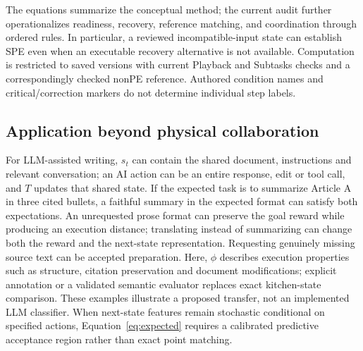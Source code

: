 \documentclass[11pt]{article}
\begin{document}
The equations summarize the conceptual method; the current audit further
operationalizes readiness, recovery, reference matching, and coordination
through ordered rules. In particular, a reviewed incompatible-input state
can establish SPE even when an executable recovery alternative is not
available. Computation is restricted to saved versions with current
Playback and Subtasks checks and a correspondingly checked nonPE
reference. Authored condition names and critical/correction markers do not
determine individual step labels.

\subsection{Application beyond physical collaboration}
For LLM-assisted writing, $s_t$ can contain the shared document,
instructions and relevant conversation; an AI action can be an entire
response, edit or tool call, and $T$ updates that shared state. If the
expected task is to summarize Article A in three cited bullets, a faithful
summary in the expected format can satisfy both expectations. An unrequested
prose format can preserve the goal reward while producing an execution
distance; translating instead of summarizing can change both the reward
and the next-state representation.
Requesting genuinely missing source text can be accepted preparation.
Here, $\phi$ describes execution properties such as structure, citation
preservation and document modifications; explicit annotation or a
validated semantic evaluator replaces exact kitchen-state comparison.
These examples illustrate a proposed transfer, not an implemented LLM
classifier. When next-state features remain stochastic conditional on
specified actions, Equation~\eqref{eq:expected} requires a calibrated
predictive acceptance region rather than exact point matching.

\appendix
\end{document}
